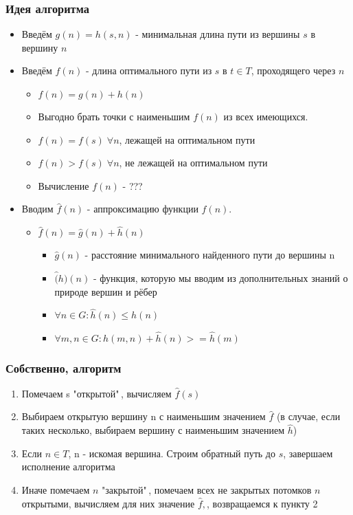 \documentclass{style}
\begin{document}
\begin{frame}
    \frametitle{Идея алгоритма}
    \begin{itemize}
        \item Введём $g(n) = h(s, n)$ - минимальная длина пути из вершины $s$ в вершину $n$
        \item Введём $f(n)$ - длина оптимального пути из $s$ в $t \in T$, проходящего через $n$
        \begin{itemize}
            \item $f(n) = g(n) + h(n)$
            \item Выгодно брать точки с наименьшим $f(n)$ из всех имеющихся.
            \item $f(n) = f(s) \; \forall n$, лежащей на оптимальном пути
            \item $f(n) > f(s) \; \forall n$, не лежащей на оптимальном пути
            \item Вычисление $f(n)$ - ???
        \end{itemize}
        \item Вводим $\hat{f}(n)$ - аппроксимацию функции $f(n)$.
        \begin{itemize}
            \item $\hat{f}(n) = \hat{g}(n) + \hat{h}(n)$
            \begin{itemize}
                \item $\hat{g}(n)$ - расстояние минимального найденного пути до вершины n
                \item $\hat(h)(n)$ - функция, которую мы вводим из дополнительных знаний о природе вершин и рёбер
                    \item $\forall n \in G : \hat{h}(n) \leq h(n)$
                    \item $\forall m, n \in G : h(m, n) + \hat{h}(n) >= \hat{h}(m)$
            \end{itemize}
        \end{itemize}
    \end{itemize}
\end{frame}

\begin{frame}
    \frametitle{Собственно, алгоритм}
    \begin{enumerate}
        \item Помечаем s "открытой"\,, вычисляем $\hat{f}(s)$
        \item Выбираем открытую вершину n с наименьшим значением $\hat{f}$ (в случае, если таких несколько, выбираем вершину с наименьшим значением $\hat{h}$)
        \item Если $n \in T$, n - искомая вершина. Строим обратный путь до $s$, завершаем исполнение алгоритма
        \item Иначе помечаем $n$ "закрытой"\,, помечаем всех не закрытых потомков $n$ открытыми, вычисляем для них значение $\hat{f},$, возвращаемся к пункту 2
    \end{enumerate}
\end{frame}
\end{document}
